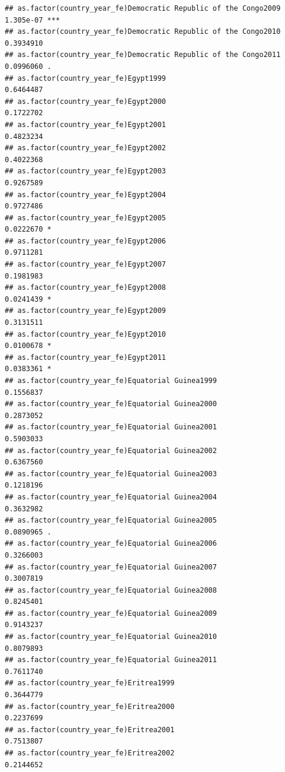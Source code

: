 \documentclass[
  a4paper,
]{article}
\begin{document}
\begin{verbatim}
## as.factor(country_year_fe)Democratic Republic of the Congo2009 1.305e-07 ***
## as.factor(country_year_fe)Democratic Republic of the Congo2010 0.3934910    
## as.factor(country_year_fe)Democratic Republic of the Congo2011 0.0996060 .  
## as.factor(country_year_fe)Egypt1999                            0.6464487    
## as.factor(country_year_fe)Egypt2000                            0.1722702    
## as.factor(country_year_fe)Egypt2001                            0.4823234    
## as.factor(country_year_fe)Egypt2002                            0.4022368    
## as.factor(country_year_fe)Egypt2003                            0.9267589    
## as.factor(country_year_fe)Egypt2004                            0.9727486    
## as.factor(country_year_fe)Egypt2005                            0.0222670 *  
## as.factor(country_year_fe)Egypt2006                            0.9711281    
## as.factor(country_year_fe)Egypt2007                            0.1981983    
## as.factor(country_year_fe)Egypt2008                            0.0241439 *  
## as.factor(country_year_fe)Egypt2009                            0.3131511    
## as.factor(country_year_fe)Egypt2010                            0.0100678 *  
## as.factor(country_year_fe)Egypt2011                            0.0383361 *  
## as.factor(country_year_fe)Equatorial Guinea1999                0.1556837    
## as.factor(country_year_fe)Equatorial Guinea2000                0.2873052    
## as.factor(country_year_fe)Equatorial Guinea2001                0.5903033    
## as.factor(country_year_fe)Equatorial Guinea2002                0.6367560    
## as.factor(country_year_fe)Equatorial Guinea2003                0.1218196    
## as.factor(country_year_fe)Equatorial Guinea2004                0.3632982    
## as.factor(country_year_fe)Equatorial Guinea2005                0.0890965 .  
## as.factor(country_year_fe)Equatorial Guinea2006                0.3266003    
## as.factor(country_year_fe)Equatorial Guinea2007                0.3007819    
## as.factor(country_year_fe)Equatorial Guinea2008                0.8245401    
## as.factor(country_year_fe)Equatorial Guinea2009                0.9143237    
## as.factor(country_year_fe)Equatorial Guinea2010                0.8079893    
## as.factor(country_year_fe)Equatorial Guinea2011                0.7611740    
## as.factor(country_year_fe)Eritrea1999                          0.3644779    
## as.factor(country_year_fe)Eritrea2000                          0.2237699    
## as.factor(country_year_fe)Eritrea2001                          0.7513807    
## as.factor(country_year_fe)Eritrea2002                          0.2144652    

\end{verbatim}
\end{document}
